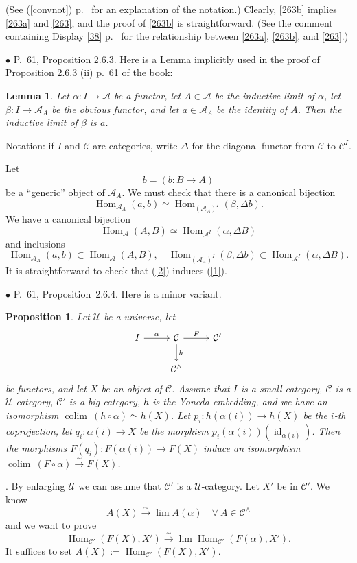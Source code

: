 \documentclass[12pt]{article}
\newtheorem{lem}[thm]{Lemma}
\newtheorem{prop}[thm]{Proposition}
\theoremstyle{remark}%
\newcommand{\bu}{\bullet}
\newcommand{\n}{\noindent}
\newcommand{\A}{\mathcal A}
\newcommand{\C}{\mathcal C}
\newcommand{\U}{\mathcal U}
\newcommand{\bp}{\begin{prop}}
\newcommand{\ep}{\end{prop}}
\newcommand{\pr}{Proposition}
\newcommand{\cn}{(See (\ref{convnot}) p.~\pageref{convnot} for an explanation of the notation.) }
\DeclareMathOperator*{\co}{colim}
\DeclareMathOperator{\id}{id}
\DeclareMathOperator{\Hom}{Hom}
\DeclareMathOperator{\h}{Hom}
\begin{document}
\n\cn Clearly, \eqref{263b} implies \eqref{263a} and \eqref{263}, and the proof of \eqref{263b} is straightforward. (See the comment containing Display \eqref{38} p.~\pageref{38} for the relationship between \eqref{263a}, \eqref{263b}, and \eqref{263}.) 


\n$\bu$ P.~61, Proposition 2.6.3. Here is a Lemma implicitly used in the proof of Proposition 2.6.3 (ii) p.~61 of the book: 
% 
\begin{lem} 
Let $\alpha:I\to\A$ be a functor, let $A\in\A$ be the inductive limit of $\alpha$, let $\beta:I\to\A_A$ be the obvious functor, and let $a\in\A_A$ be the identity of $A$. Then the inductive limit of $\beta$ is $a$. 
\end{lem} 
%
\n{\em Proof.} Notation: if $I$ and $\C$ are categories, write $\Delta$ for the diagonal functor from $\C$ to $\C^I$. 

Let
$$
b=(b:B\to A)
$$
be a ``generic'' object of $\A_A$. We must check that there is a canonical bijection
%
\begin{equation}\label{1}
\Hom_{\A_A}(a,b)\simeq\Hom_{(\A_A)^I}(\beta,\Delta b).
\end{equation}
%
We have a canonical bijection  
%
\begin{equation}\label{2}
\Hom_\A(A,B)\simeq\Hom_{\A^I}(\alpha,\Delta B)
\end{equation}
%
and inclusions  
$$
\Hom_{\A_A}(a,b)\subset\Hom_\A(A,B),\quad
%
\Hom_{(\A_A)^I}(\beta,\Delta b)\subset\Hom_{\A^I}(\alpha,\Delta B).
$$
It is straightforward to check that (\ref{2}) induces (\ref{1}). 


\n$\bu$ P.~61, \pr\ 2.6.4. Here is a minor variant. 
%
\bp 
Let $\U$ be a universe, let  
$$
\begin{tikzcd}
I\ar{r}{\alpha}&\C\ar{d}{h}\ar{r}{F}&\C'\\
&\C^\wedge
\end{tikzcd}
$$ 
be functors, and let $X$ be an object of $\C$. Assume that $I$ is a small category, $\C$ is a $\U$-category, $\C'$ is a big category, $h$ is the Yoneda embedding, and we have an isomorphism $\co\ (h\circ\alpha)\simeq h(X)$. Let $p_i:h(\alpha(i))\to h(X)$ be the $i$-th coprojection, let $q_i:\alpha(i)\to X$ be the morphism $p_i(\alpha(i))(\id_{\alpha(i)})$. Then the morphisms $F(q_i):F(\alpha(i))\to F(X)$ induce an isomorphism $\co\ (F\circ\alpha)\xrightarrow\sim F(X)$.  
\ep
% 
\n{\em Proof}. By enlarging $\U$ we can assume that $\C'$ is a $\U$-category. Let $X'$ be in $\C'$. We know 
$$
A(X)\xrightarrow\sim\lim A(\alpha)\quad\forall\ A\in\C^\wedge 
$$ 
and we want to prove 
$$
\h_{\C'}(F(X),X')\xrightarrow\sim\lim\h_{\C'}(F(\alpha),X'). 
$$ 
It suffices to set $A(X):=\h_{\C'}(F(X),X')$. 
\end{document}
